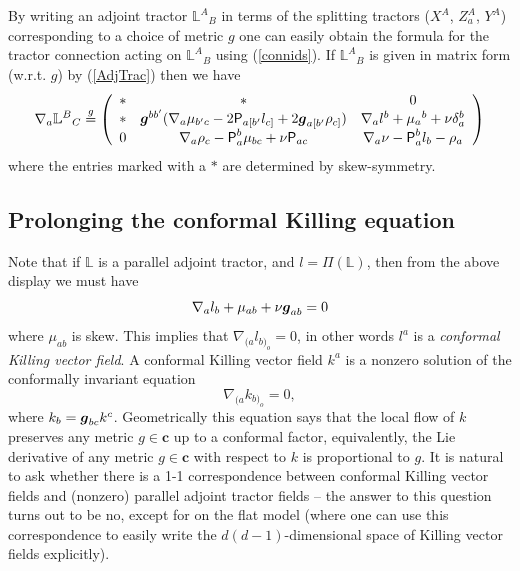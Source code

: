 \documentclass[a4paper,12pt]{amsart}
\newcommand{\V}{\mbox{\sf P}}
\newcommand{\cc}{\boldsymbol{c}}
\def\bg{\mbox{\boldmath $g$}}
\theoremstyle{remark}
\newcommand{\nn}[1]{(\ref{#1})}
\begin{document}
By writing an adjoint tractor $\mathbb{L}^A{_B}$ in terms of the splitting tractors ($X^A$, $Z^A_a$, $Y^A$) corresponding to a choice of metric $g$ one can easily obtain the formula for the tractor connection acting on $\mathbb{L}^A{_B}$ using \nn{connids}. If $\mathbb{L}^A{_B}$ is given in matrix form (w.r.t. $g$) by \nn{AdjTrac} then we have
\begin{equation} \label{AdjTracConn}
\nabla_a \mathbb{L}^B{_C} \overset{g}{=} 
\left(\begin{array}{ccc} * & * & 0 \\
* & \bg^{bb'}(\nabla_a\mu_{b'c} - 2\V_{a[b'}l_{c]} + 2\bg_{a[b'}\rho_{c]}) & \nabla_a l^b + \mu_a{^b} + \nu \delta_a^b \\ 
0 & \nabla_a\rho_c - \V_a^b\mu_{bc} +\nu \V_{ac} & \nabla_a\nu -\V_a^b l_b -\rho_a\\
\end{array}\right)
\end{equation}
where the entries marked with a $*$ are determined by skew-symmetry.

\subsection{Prolonging the conformal Killing equation}
Note that if $\mathbb{L}$ is a parallel adjoint tractor, and $l=\Pi(\mathbb{L})$, then from the above display we must have
$$
\nabla_a l_b + \mu_{ab} + \nu \bg_{ab} = 0
$$
where $\mu_{ab}$ is skew. This implies that $\nabla_{(a} l_{b)_o}=0$, in other words $l^a$ is a \emph{conformal Killing vector field}. A conformal Killing vector field $k^a$ is a nonzero solution of the conformally invariant equation
$$
\nabla_{(a} k_{b)_o} =0,
$$ 
where $k_b=\bg_{bc}k^c$. Geometrically this equation says that the local flow of $k$ preserves any metric $g\in \cc$ up to a conformal factor, equivalently, the Lie derivative of any metric $g\in \cc$ with respect to $k$ is proportional to $g$. It is natural to ask whether there is a 1-1 correspondence between conformal Killing vector fields and (nonzero) parallel adjoint tractor fields -- the answer to this question turns out to be no, except for on the flat model (where one can use this correspondence to easily write the $d(d-1)$-dimensional space of Killing vector fields explicitly).
\end{document}
